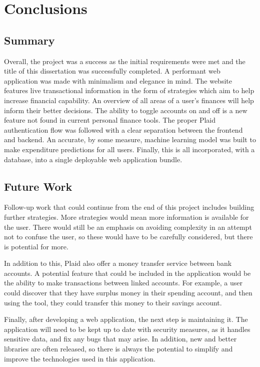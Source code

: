 \chapter{Conclusions}
\label{ch:conclusions}

\section{Summary}
Overall, the project was a success as the initial requirements were met and the title of this dissertation was successfully completed. A performant web application was made with minimalism and elegance in mind. The website features live transactional information in the form of strategies which aim to help increase financial capability. An overview of all areas of a user's finances will help inform their better decisions. The ability to toggle accounts on and off is a new feature not found in current personal finance tools. The proper Plaid authentication flow was followed with a clear separation between the frontend and backend. An accurate, by some measure, machine learning model was built to make expenditure predictions for all users. Finally, this is all incorporated, with a database, into a single deployable web application bundle.

\section{Future Work}
Follow-up work that could continue from the end of this project includes building further strategies. More strategies would mean more information is available for the user. There would still be an emphasis on avoiding complexity in an attempt not to confuse the user, so these would have to be carefully considered, but there is potential for more.

In addition to this, Plaid also offer a money transfer service between bank accounts. A potential feature that could be included in the application would be the ability to make transactions between linked accounts. For example, a user could discover that they have surplus money in their spending account, and then using the tool, they could transfer this money to their savings account.

Finally, after developing a web application, the next step is maintaining it. The application will need to be kept up to date with security measures, as it handles sensitive data, and fix any bugs that may arise. In addition, new and better libraries are often released, so there is always the potential to simplify and improve the technologies used in this application.